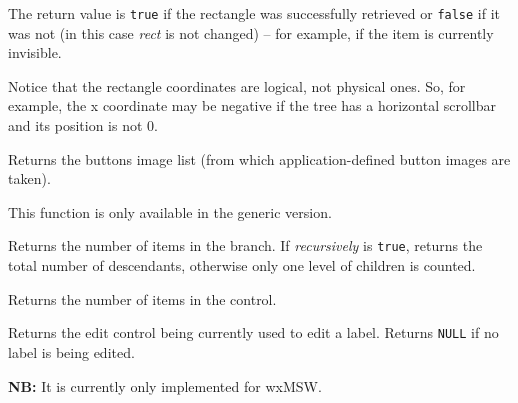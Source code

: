 The return value is {\tt true} if the rectangle was successfully retrieved or {\tt false}
if it was not (in this case {\it rect} is not changed) -- for example, if the
item is currently invisible.

Notice that the rectangle coordinates are logical, not physical ones. So, for
example, the x coordinate may be negative if the tree has a horizontal
scrollbar and its position is not $0$.




\label{wxtreectrlgetbuttonsimagelist}


Returns the buttons image list (from which application-defined button images are taken).

This function is only available in the generic version.


\label{wxtreectrlgetchildrencount}


Returns the number of items in the branch. If {\it recursively} is {\tt true}, returns the total number
of descendants, otherwise only one level of children is counted.


\label{wxtreectrlgetcount}


Returns the number of items in the control.


\label{wxtreectrlgeteditcontrol}


Returns the edit control being currently used to edit a label. Returns {\tt NULL}
if no label is being edited.

{\bf NB:} It is currently only implemented for wxMSW.


\label{wxtreectrlgetfirstchild}

